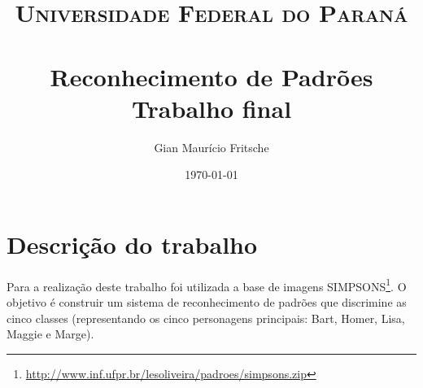 \documentclass[paper=a4, fontsize=11pt]{scrartcl} %
\title{	
\normalfont \normalsize 
\textsc{Universidade Federal do Paraná} \\ [25pt] %
\horrule{0.5pt} \\[0.4cm] %
\huge Reconhecimento de Padrões \\
\large Trabalho final  %
\horrule{2pt} \\[0.5cm] %
}
\author{Gian Maurício Fritsche} %
\date{\normalsize\today} %
\numberwithin{equation}{section} %
\numberwithin{figure}{section} %
\numberwithin{table}{section} %
\begin{document}
\maketitle %


\section{Descrição do trabalho}

Para a realização deste trabalho foi utilizada a base de imagens SIMPSONS\footnote{\url{http://www.inf.ufpr.br/lesoliveira/padroes/simpsons.zip}}.
O objetivo é construir um sistema de reconhecimento de padrões que discrimine as cinco classes (representando os cinco personagens principais: Bart, Homer, Lisa, Maggie e Marge).
\end{document}
